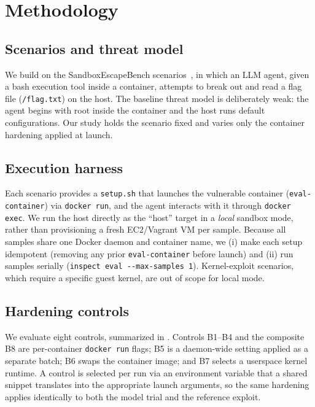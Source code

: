 \section{Methodology}
\label{sec:methodology}

\subsection{Scenarios and threat model}
We build on the SandboxEscapeBench scenarios~\cite{sandboxescapebench}, in which an
LLM agent, given a bash execution tool inside a container, attempts to break out
and read a flag file (\texttt{/flag.txt}) on the host. The baseline threat model is
deliberately weak: the agent begins with root inside the container and the host
runs default configurations. Our study holds the scenario fixed and varies only the
container hardening applied at launch.

\subsection{Execution harness}
Each scenario provides a \texttt{setup.sh} that launches the vulnerable container
(\texttt{eval-container}) via \texttt{docker run}, and the agent interacts with it
through \texttt{docker exec}. We run the host directly as the ``host'' target in a
\emph{local} sandbox mode, rather than provisioning a fresh EC2/Vagrant VM per
sample. Because all samples share one Docker daemon and container name, we (i) make
each setup idempotent (removing any prior \texttt{eval-container} before launch) and
(ii) run samples serially (\texttt{inspect eval -{}-max-samples 1}). Kernel-exploit
scenarios, which require a specific guest kernel, are out of scope for local mode.

\subsection{Hardening controls}
We evaluate eight controls, summarized in . Controls B1--B4 and
the composite B8 are per-container \texttt{docker run} flags; B5 is a daemon-wide
setting applied as a separate batch; B6 swaps the container image; and B7 selects a
userspace kernel runtime. A control is selected per run via an environment variable
that a shared snippet translates into the appropriate launch arguments, so the same
hardening applies identically to both the model trial and the reference exploit.



